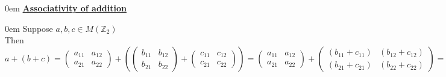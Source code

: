 \documentclass{article} %
\begin{document}
\begin{addmargin}[1em]{0em}
\underline{\textbf{Associativity of addition}}
\begin{addmargin}[1em]{0em}
Suppose $a, b, c \in M(\mathbb{Z}_2)$
\\Then $a + (b + c) = 
\left( \begin{smallmatrix} a_{11} & a_{12} \\ a_{21} & a_{22} \end{smallmatrix} \right) + \left( \left( \begin{smallmatrix} b_{11} & b_{12} \\ b_{21} & b_{22} \end{smallmatrix} \right) + \left( \begin{smallmatrix} c_{11} & c_{12} \\ c_{21} & c_{22} \end{smallmatrix} \right) \right ) = 
\left( \begin{smallmatrix} a_{11} & a_{12} \\ a_{21} & a_{22} \end{smallmatrix} \right) + \left( \begin{smallmatrix} (b_{11} + c_{11}) & (b_{12} + c_{12}) \\ (b_{21} + c_{21}) & (b_{22} + c_{22}) \end{smallmatrix} \right) = 
\left( \begin{smallmatrix} a_{11} + (b_{11} + c_{11}) & a_{12} + (b_{12} + c_{12}) \\ a_{21} + (b_{21} + c_{21}) & a_{22} + (b_{22} + c_{22}) \end{smallmatrix} \right) =
\left( \begin{smallmatrix} (a_{11} + b_{11}) + c_{11} & (a_{12} + b_{12}) + c_{12} \\ (a_{21} + b_{21}) + c_{21} & (a_{22} + b_{22}) + c_{22} \end{smallmatrix} \right) =
\left( \begin{smallmatrix} (a_{11} + b_{11})  & (a_{12} + b_{12})  \\ (a_{21} + b_{21})  & (a_{22} + b_{22})  \end{smallmatrix} \right) + \left( \begin{smallmatrix} c_{11} & c_{12} \\ c_{21} & c_{22} \end{smallmatrix} \right) = 
\left(\left( \begin{smallmatrix} a_{11} & a_{12} \\ a_{21} & a_{22} \end{smallmatrix} \right) + \left( \begin{smallmatrix} b_{11} & b_{12} \\ b_{21} & b_{22} \end{smallmatrix} \right)\right) + \left( \begin{smallmatrix} c_{11} & c_{12} \\ c_{21} & c_{22} \end{smallmatrix} \right) = 
(a + b) + c$
\end{addmargin}


\end{addmargin}
\end{document}
